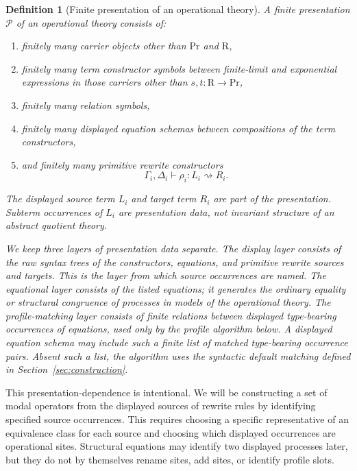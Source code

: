 \documentclass[11pt]{article}
\newcommand{\Proc}{\mathrm{Pr}}
\newcommand{\Rew}{\mathrm{R}}
\newcommand{\rw}{\rightsquigarrow}
\newtheorem{definition}{Definition}[section]
\begin{document}
\begin{definition}[Finite presentation of an operational theory]
A finite presentation \(\mathcal{P}\) of an operational theory consists of:
\begin{enumerate}[label=\textup{(\roman*)}]
    \item finitely many carrier objects other than \(\Proc\) and \(\Rew\),
    \item finitely many term constructor symbols between finite-limit and exponential expressions in those carriers other than $s,t:\Rew \to \Proc$,
    \item finitely many relation symbols,
    \item finitely many displayed equation schemas between compositions of the term constructors,
    \item and finitely many primitive rewrite constructors
    \[
        \Gamma_i,\Delta_i\vdash \rho_i:L_i\rw R_i.
    \]
\end{enumerate}
The displayed source term \(L_i\) and target term \(R_i\) are part of the presentation. Subterm occurrences of \(L_i\) are presentation data, not invariant structure of an abstract quotient theory.

We keep three layers of presentation data separate.  The \emph{display layer} consists of the raw syntax trees of the constructors, equations, and primitive rewrite sources and targets.  This is the layer from which source occurrences are named.  The \emph{equational layer} consists of the listed equations; it generates the ordinary equality or structural congruence of processes in models of the operational theory.  The \emph{profile-matching layer} consists of finite relations between displayed type-bearing occurrences of equations, used only by the profile algorithm below.  A displayed equation schema may include such a finite list of matched type-bearing occurrence pairs.  Absent such a list, the algorithm uses the syntactic default matching defined in Section~\ref{sec:construction}.
\end{definition}

This presentation-dependence is intentional. We will be constructing a set of modal operators from the displayed sources of rewrite rules by identifying specified source occurrences. This requires choosing a specific representative of an equivalence class for each source and choosing which displayed occurrences are operational sites. Structural equations may identify two displayed processes later, but they do not by themselves rename sites, add sites, or identify profile slots.
\end{document}
